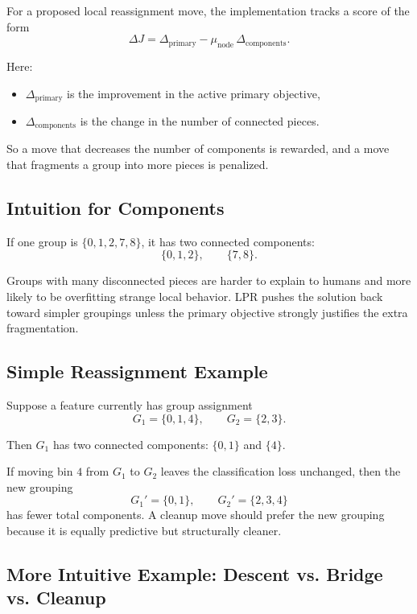 \documentclass[11pt]{article}
\begin{document}
For a proposed local reassignment move, the implementation tracks a score of the form
\[
\Delta J = \Delta_{\mathrm{primary}} - \mu_{\mathrm{node}} \, \Delta_{\mathrm{components}}.
\]

Here:

\begin{itemize}
\item \(\Delta_{\mathrm{primary}}\) is the improvement in the active primary objective,
\item \(\Delta_{\mathrm{components}}\) is the change in the number of connected pieces.
\end{itemize}

So a move that decreases the number of components is rewarded, and a move that fragments a group into more pieces is penalized.

\subsection{Intuition for Components}

If one group is \(\{0,1,2,7,8\}\), it has two connected components:
\[
\{0,1,2\}, \qquad \{7,8\}.
\]

Groups with many disconnected pieces are harder to explain to humans and more likely to be overfitting strange local behavior. LPR pushes the solution back toward simpler groupings unless the primary objective strongly justifies the extra fragmentation.

\subsection{Simple Reassignment Example}

Suppose a feature currently has group assignment
\[
G_1 = \{0,1,4\}, \qquad G_2 = \{2,3\}.
\]

Then \(G_1\) has two connected components: \(\{0,1\}\) and \(\{4\}\).

If moving bin \(4\) from \(G_1\) to \(G_2\) leaves the classification loss unchanged, then the new grouping
\[
G_1' = \{0,1\}, \qquad G_2' = \{2,3,4\}
\]
has fewer total components. A cleanup move should prefer the new grouping because it is equally predictive but structurally cleaner.

\subsection{More Intuitive Example: Descent vs. Bridge vs. Cleanup}
\end{document}
